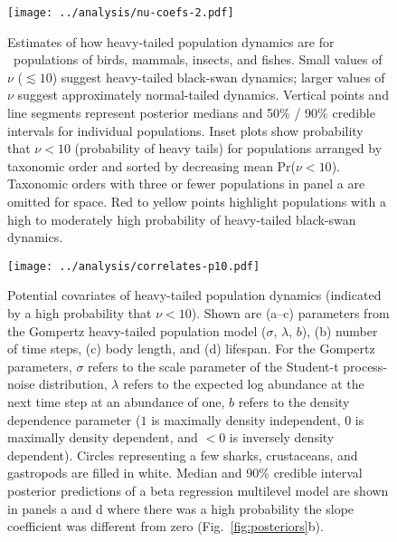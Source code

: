 \clearpage

\begin{figure}[htbp]
\begin{center}
\texttt{[image: ../analysis/nu-coefs-2.pdf]}
\caption{
Estimates of how heavy-tailed population dynamics are for \nuCoefPopN\ populations of birds, mammals, insects, and fishes. Small values of $\nu$ ($\lesssim 10$) suggest heavy-tailed black-swan dynamics; larger values of $\nu$ suggest approximately normal-tailed dynamics. Vertical points and line segments represent posterior medians and 50\% / 90\% credible intervals for individual populations. Inset plots show probability that $\nu < 10$ (probability of heavy tails) for populations arranged by taxonomic order and sorted by decreasing mean Pr($\nu < 10$). Taxonomic orders with three or fewer populations in panel a are omitted for space. Red to yellow points highlight populations with a high to moderately high probability of heavy-tailed black-swan dynamics.
}
\label{fig:nu-coefs}
\end{center}
\end{figure}
\clearpage

\begin{figure}[htbp]
\begin{center}
\texttt{[image: ../analysis/correlates-p10.pdf]}
\caption{
Potential covariates of heavy-tailed population dynamics (indicated by a high probability that $\nu < 10$). Shown are (a--c) parameters from the Gompertz heavy-tailed population model ($\sigma$, $\lambda$, $b$), (b) number of time steps, (c) body length, and (d) lifespan. For the Gompertz parameters, $\sigma$ refers to the scale parameter of the Student-t process-noise distribution, $\lambda$ refers to the expected log abundance at the next time step at an abundance of one, $b$ refers to the density dependence parameter ($1$ is maximally density independent, $0$ is maximally density dependent, and $<0$ is inversely density dependent). Circles representing a few sharks, crustaceans, and gastropods are filled in white. Median and 90\% credible interval posterior predictions of a beta regression multilevel model are shown in panels a and d where there was a high probability the slope coefficient was different from zero (Fig.~\ref{fig:posteriors}b).
}
\label{fig:correlates}
\end{center}
\end{figure}

